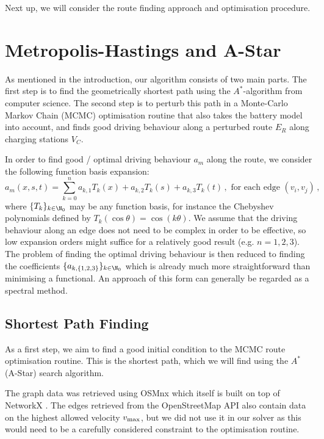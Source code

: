 \documentclass{prettytex/ox/mmsc-special-topic}
\begin{document}
  Next up, we will consider the route finding approach and optimisation procedure.

  \section{Metropolis-Hastings and A-Star}
  As mentioned in the introduction, our algorithm consists of two main parts.
  The first step is to find the geometrically shortest path using the $A^*$-algorithm from computer science.
  The second step is to perturb this path in a Monte-Carlo Markov Chain (MCMC) optimisation routine that also takes the battery model into account, and finds good driving behaviour along a perturbed route $E_R$ along charging stations $V_C$.

  In order to find good / optimal driving behaviour $a_m$ along the route, we consider the following function basis expansion:
  \begin{equation}
    a_m(x, s, t) = \sum_{k=0}^{n} a_{k,1} T_k(x) + a_{k,2} T_k(s) + a_{k,3} T_k(t)\,, \text{ for each edge } (v_i, v_j)\,,
    \label{eq:spectral-expansion}
  \end{equation}
  where $\{T_k\}_{k\in \N_0}$ may be any function basis, for instance the Chebyshev polynomials defined by $T_k(\cos \theta) = \cos(k\theta)$.
  We assume that the driving behaviour along an edge does not need to be complex in order to be effective, so low expansion orders might suffice for a relatively good result (e.g. $n = 1, 2, 3$).
  The problem of finding the optimal driving behaviour is then reduced to finding the coefficients $\{a_{k,\{1,2,3\}}\}_{k\in\N_0}$ which is already much more straightforward than minimising a functional.
  An approach of this form can generally be regarded as a spectral method.

  \subsection{Shortest Path Finding}
  As a first step, we aim to find a good initial condition to the MCMC route optimisation routine.
  This is the shortest path, which we will find using the $A^*$ (A-Star) search algorithm.

  The graph data was retrieved using OSMnx \parencite{osmnx} which itself is built on top of NetworkX \parencite{networkx}. The edges retrieved from the OpenStreetMap API also contain data on the highest allowed velocity $v_{\rm max}$, but we did not use it in our solver as this would need to be a carefully considered constraint to the optimisation routine.
\end{document}
